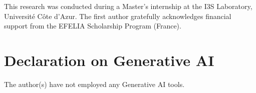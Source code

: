 \documentclass[
]{ceurart}
\begin{document}
\begin{acknowledgments}
This research was conducted during a Master's internship at the I3S Laboratory, Université Côte d'Azur. The first author gratefully acknowledges financial support from the EFELIA Scholarship Program (France).
\end{acknowledgments}

\section*{Declaration on Generative AI}
The author(s) have not employed any Generative AI tools.
\end{document}
